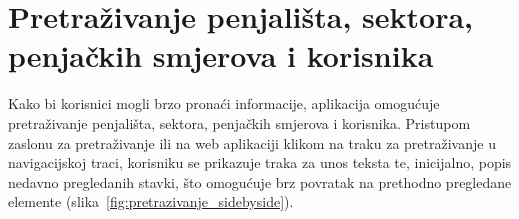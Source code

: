 \section{Pretraživanje penjališta, sektora, penjačkih smjerova i korisnika}

Kako bi korisnici mogli brzo pronaći informacije, aplikacija omogućuje pretraživanje penjališta, sektora, penjačkih smjerova i korisnika. Pristupom zaslonu za pretraživanje ili na web aplikaciji klikom na traku za pretraživanje u navigacijskoj traci, korisniku se prikazuje traka za unos teksta te, inicijalno, popis nedavno pregledanih stavki, što omogućuje brz povratak na prethodno pregledane elemente (slika~\ref{fig:pretrazivanje_sidebyside}).

\begin{figure}[H]
    \centering
    \begin{subfigure}[b]{0.35\textwidth}
        \centering

\end{subfigure}
\end{figure}
